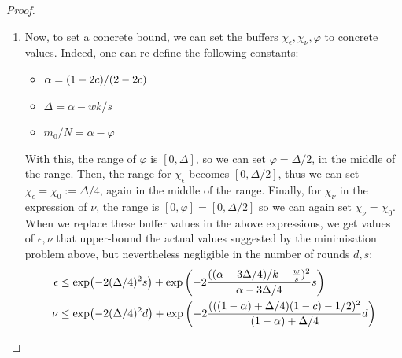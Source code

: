 \begin{proof}
\begin{enumerate}[label=\arabic*)]
    \item Now, to set a concrete bound, we can set the buffers $\chi_\epsilon, \chi_\nu, \varphi$ to concrete values.
    Indeed, one can re-define the following constants:
    \begin{itemize}
        \item $\alpha = (1-2c)/(2-2c)$
        \item $\Delta = \alpha-wk/s$
        \item $m_0/N = \alpha-\varphi$
    \end{itemize}
    With this, the range of $\varphi$ is $[0, \Delta]$, so we can set $\varphi = \Delta/2$, in the middle of the range.
    Then, the range for $\chi_\epsilon$ becomes $[0, \Delta/2]$, thus we can set $\chi_\epsilon = \chi_0:=\Delta/4$, again in the middle of the range.
    Finally, for $\chi_\nu$ in the expression of $\nu$, the range is $[0, \varphi]=[0, \Delta/2]$ so we can again set $\chi_\nu=\chi_0$.
    When we replace these buffer values in the above expressions, we get values of $\epsilon, \nu$ that upper-bound the actual values suggested by the minimisation problem above, but nevertheless negligible in the number of rounds $d, s$:
    \begin{align}
        \epsilon &\leq \exp( -2(\Delta/4)^2 s ) + \exp\left( -2\dfrac{ ((\alpha-3\Delta/4)/k-\frac{w}{s})^2 }{\alpha-3\Delta/4} s \right)
        \\
        \nu&\leq \exp( -2(\Delta/4)^2 d ) + \exp\left( -2\dfrac{ (((1-\alpha)+\Delta/4)(1-c)-1/2)^2 }{(1-\alpha)+\Delta/4} d \right)
    \end{align}

\end{enumerate}
\end{proof}